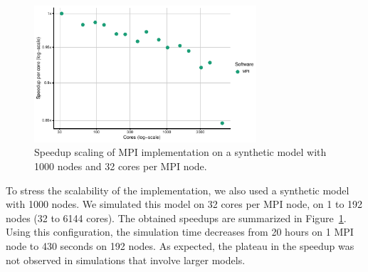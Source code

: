\documentclass[sn-mathphys-num]{sn-jnl}%
\begin{document}
\begin{figure}%
\centering
\includegraphics[width=3.25in]{plots/synth_mpi_speedup.pdf}
\caption{Speedup scaling of MPI implementation on a synthetic model with 1000 nodes and 32 cores per MPI node.}
\label{fig:synthetic_results}
\end{figure}

To stress the scalability of the implementation, we also used a synthetic model with 1000 nodes. We simulated this model on 32 cores per MPI node, on 1 to 192 nodes (32 to 6144 cores). The obtained speedups are summarized in Figure~\ref{fig:synthetic_results}. Using this configuration, the simulation time decreases from 20 hours on 1 MPI node to 430 seconds on 192 nodes. As expected, the plateau in the speedup was not observed in simulations that involve larger models.



\end{document}
